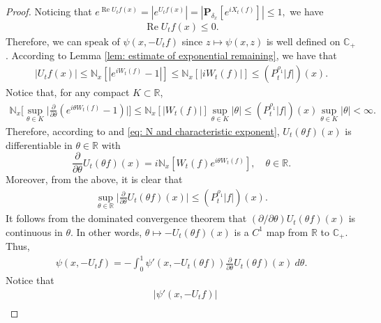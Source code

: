 \documentclass[EJP]{ejpecp} %
\begin{document}
\begin{proof}
  Noticing that
 $
     e^{\operatorname{Re} U_tf(x)}
    = |e^{U_tf(x)}|
    = |\mathbf P_{\delta_x}[e^{i X_t(f)}]|
    \leq 1,
$
  we have
  \begin{align}
    \label{eq: -v has positive real part}
    \operatorname{Re} U_tf(x)
    \leq 0.
  \end{align}
  Therefore, we can speak of $\psi(x,-U_tf)$ since $z\mapsto \psi(x,z)$ is well defined on $\mathbb C_+$.
  According to Lemma \ref{lem: estimate of exponential remaining}, we have that
  \begin{align}
    \label{eq: upper bound for vf}
    |U_tf(x)|
    \leq \mathbb N_x[|e^{i W_t(f)} - 1|]
    \leq \mathbb N_x[|i W_t(f)|]
    \leq (P^{\rho_1}_t |f|)(x).
  \end{align}
  Notice that, for any compact $K \subset \mathbb R$,
  \begin{align}
    \label{eq: estimate of deriavetive of v(theta)}
    \mathbb N_x \Big[\sup_{\theta \in K} \Big|\frac{\partial}{\partial \theta} (e^{i\theta W_t(f)} - 1) \Big|\Big]
    \leq \mathbb N_x[|W_t(f)|] \sup_{\theta \in K}|\theta|
    \leq (P^{\rho_1}_t |f|)(x) \sup_{\theta \in K}|\theta| < \infty.
  \end{align}
  Therefore, according to \cite[Theorem A.5.2]{Durrett2010Probability} and \eqref{eq: N and characteristic exponent}, $ U_t( \theta f)( x )$ is differentiable in $\theta \in \mathbb R$ with
  \[
    \frac{\partial}{\partial \theta} U_t(\theta f)(x)
    = i\mathbb N_x[W_t(f) e^{i\theta W_t(f)}],
    \quad \theta \in \mathbb R.
  \]
  Moreover, from the above, it is clear that
  \begin{align}
    \label{eq: upper bounded for derivative of v(theta)}
    \sup_{\theta \in \mathbb R}\Big| \frac{\partial}{\partial \theta}U_t(\theta f)(x)\Big|
    \leq ( P^{\rho_1}_t |f|)(x).
  \end{align}
  It follows from the dominated convergence theorem that $(\partial/\partial \theta)U_t(\theta f)(x)$ is continuous in $\theta$.
  In other words, $\theta \mapsto -U_t(\theta f)(x)$ is a $C^1$ map from $\mathbb R$ to $\mathbb C_+$.
  Thus,
  \begin{align}
    \label{eq: path integration representation of psi(v)}
    \psi(x,-U_tf)
    = -\int_0^1 \psi' (x,-U_t(\theta f) ) \frac{\partial}{\partial \theta} U_t(\theta f)(x)~d\theta.
  \end{align}
  Notice that
  \begin{align}
    & |\psi'(x, -U_tf)| \\

\end{align}
\end{proof}
\end{document}
